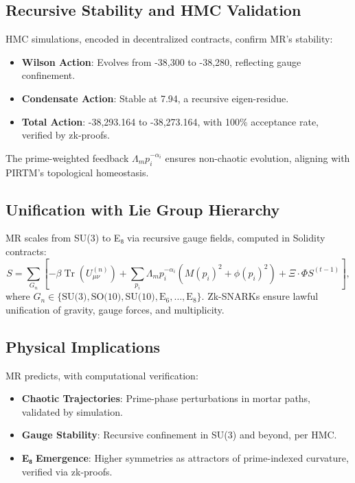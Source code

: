 \documentclass{article}
\theoremstyle{plain}
\begin{document}
\subsection{Recursive Stability and HMC Validation}

HMC simulations, encoded in decentralized contracts, confirm MR’s stability:
\begin{itemize}
    \item \textbf{Wilson Action}: Evolves from -38,300 to -38,280, reflecting gauge confinement.
    \item \textbf{Condensate Action}: Stable at 7.94, a recursive eigen-residue.
    \item \textbf{Total Action}: -38,293.164 to -38,273.164, with 100\% acceptance rate, verified by zk-proofs.
\end{itemize}
The prime-weighted feedback \(\Lambda_m p_i^{-\alpha_i}\) ensures non-chaotic evolution, aligning with PIRTM’s topological homeostasis.

\subsection{Unification with Lie Group Hierarchy}

MR scales from SU(3) to E₈ via recursive gauge fields, computed in Solidity contracts:
\begin{equation}
S = \sum_{G_n} \left[ -\beta \operatorname{Tr}(U_{\mu\nu}^{(n)}) + \sum_{p_i} \Lambda_m p_i^{-\alpha_i} (M(p_i)^2 + \phi(p_i)^2) + \Xi \cdot \Phi S^{(t-1)} \right],
\end{equation}
where \(G_n \in \{ \text{SU(3)}, \text{SO(10)}, \text{SU(10)}, \text{E}_6, \ldots, \text{E}_8 \} \). Zk-SNARKs ensure lawful unification of gravity, gauge forces, and multiplicity.

\subsection{Physical Implications}

MR predicts, with computational verification:
\begin{itemize}
    \item \textbf{Chaotic Trajectories}: Prime-phase perturbations in mortar paths, validated by simulation.
    \item \textbf{Gauge Stability}: Recursive confinement in SU(3) and beyond, per HMC.
    \item \textbf{E₈ Emergence}: Higher symmetries as attractors of prime-indexed curvature, verified via zk-proofs.
\end{itemize}
\end{document}
